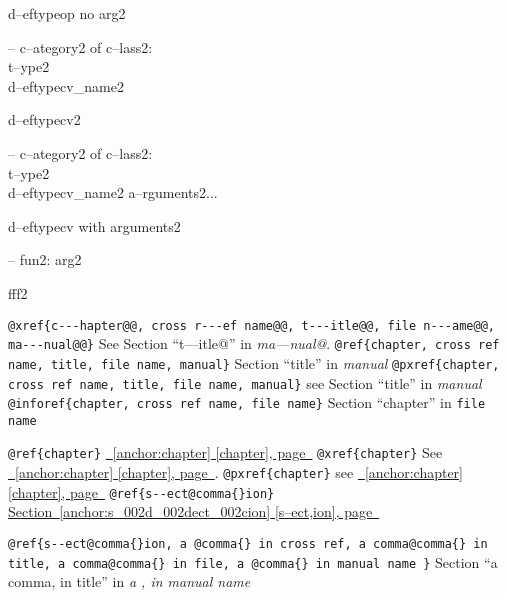 \documentclass{book}
\begin{document}
%
d--eftypeop no arg2

\hbox{}-- c--ategory2 of c--lass2:\leavevmode{}\\t--ype2\leavevmode{}\\d--eftypecv\_name2


%
d--eftypecv2

\hbox{}-- c--ategory2 of c--lass2:\leavevmode{}\\t--ype2\leavevmode{}\\d--eftypecv\_name2 a--rguments2...


%
d--eftypecv with arguments2

\hbox{}-- fun2: arg2


%
fff2


\texttt{@xref\{c{-}{-}{-}hapter@@, cross r{-}{-}{-}ef name@@, t{-}{-}{-}itle@@, file n{-}{-}{-}ame@@, ma{-}{-}{-}nual@@\}} See Section ``t---itle@'' in \textit{ma---nual@}.
\texttt{@ref\{chapter, cross ref name, title, file name, manual\}} Section ``title'' in \textit{manual}
\texttt{@pxref\{chapter, cross ref name, title, file name, manual\}} see Section ``title'' in \textit{manual}
\texttt{@inforef\{chapter, cross ref name, file name\}} Section ``chapter'' in \texttt{file name}

\texttt{@ref\{chapter\}} \hyperref[anchor:chapter]{\chaptername~\ref*{anchor:chapter} [chapter], page~\pageref*{anchor:chapter}}
\texttt{@xref\{chapter\}} See \hyperref[anchor:chapter]{\chaptername~\ref*{anchor:chapter} [chapter], page~\pageref*{anchor:chapter}}.
\texttt{@pxref\{chapter\}} see \hyperref[anchor:chapter]{\chaptername~\ref*{anchor:chapter} [chapter], page~\pageref*{anchor:chapter}}
\texttt{@ref\{s{-}{-}ect@comma\{\}ion\}} \hyperref[anchor:s_002d_002dect_002cion]{Section~\ref*{anchor:s_002d_002dect_002cion} [s--ect,ion], page~\pageref*{anchor:s_002d_002dect_002cion}}

\texttt{@ref\{s{-}{-}ect@comma\{\}ion, a @comma\{\} in cross
ref, a comma@comma\{\} in title, a comma@comma\{\} in file, a @comma\{\} in manual name \}}
Section ``a comma, in title'' in \textit{a , in manual name}
\end{document}
